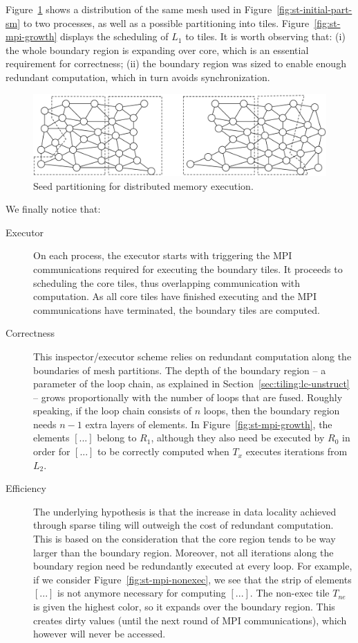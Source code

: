 Figure~\ref{fig:st-mpi-init} shows a distribution of the same mesh used in Figure~\ref{fig:st-initial-part-sm} to two processes, as well as a possible partitioning into tiles. Figure~\ref{fig:st-mpi-growth} displays the scheduling of $L_1$ to tiles. It is worth observing that: (i) the whole boundary region is expanding over core, which is an essential requirement for correctness; (ii) the boundary region was sized to enable enough redundant computation, which in turn avoids synchronization.

\begin{figure}
\centering
\includegraphics[width=\textwidth]{sparsetiling/figures/base_mesh_doppio.pdf}
\caption{Seed partitioning for distributed memory execution.}
\label{fig:st-mpi-init}
\end{figure}

We finally notice that:
\begin{description}
\item[Executor] On each process, the executor starts with triggering the MPI communications required for executing the boundary tiles. It proceeds to scheduling the core tiles, thus overlapping communication with computation. As all core tiles have finished executing and the MPI communications have terminated, the boundary tiles are computed.
\item[Correctness] This inspector/executor scheme relies on redundant computation along the boundaries of mesh partitions. The depth of the boundary region -- a parameter of the loop chain, as explained in Section~\ref{sec:tiling:lc-unstruct} -- grows proportionally with the number of loops that are fused. Roughly speaking, if the loop chain consists of $n$ loops, then the boundary region needs $n-1$ extra layers of elements. In Figure~\ref{fig:st-mpi-growth}, the elements $[...]$ belong to $R_1$, although they also need be executed by $R_0$ in order for $[...]$ to be correctly computed when $T_x$ executes iterations from $L_2$.  
\item[Efficiency] The underlying hypothesis is that the increase in data locality achieved through sparse tiling will outweigh the cost of redundant computation. This is based on the consideration that the core region tends to be way larger than the boundary region. Moreover, not all iterations along the boundary region need be redundantly executed at every loop. For example, if we consider Figure~\ref{fig:st-mpi-nonexec}, we see that the strip of elements $[...]$ is not anymore necessary for computing $[...]$. The non-exec tile $T_{ne}$ is given the highest color, so it expands over the boundary region. This creates dirty values (until the next round of MPI communications), which however will never be accessed. 
\end{description}



